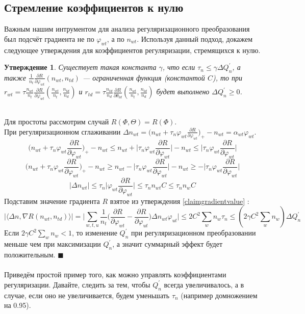 \documentclass[12pt]{article}
\newtheorem{claim}[remark]{Утверждение}
\newenvironment{Proof} 
	{\par\noindent{\bf Доказательство.}} 
	{\hfill$\blacksquare$}
\renewcommand{\leq}{\leqslant}
\renewcommand{\geq}{\geqslant}
\renewcommand{\phi}{\varphi}
\begin{document}
           \subsection{Стремление коэффициентов к нулю}
Важным нашим интрументом для анализа регуляризационного преобразования был подсчёт градиента не по $\phi_{wt}$, а по $n_{wt}$. Используя данный подход, докажем следующее утверждения для коэффициентов регуляризации, стремящихся к нулю.\\
\begin{claim}
Существует такая константа $\gamma$, что если $\tau_n \leq \gamma \Delta Q^{\prime}_n$, а также $\frac{1}{n_t} \frac{\partial{R}}{\partial{\phi_{wt}}}(n_{wt}, n_{td})$ --- ограниченная функция (константой $C$), то при $r_{wt} = \tau \frac{n_{wt}}{n_t} \frac{\partial{R}}{\partial{\phi_{wt}}} \left(\frac{n_{wt}}{n_t}, \frac{n_{td}}{n_d}\right)$ и $r_{td}= \tau \frac{n_{td}}{n_d} \frac{\partial{R}}{\partial{\theta_{td}}} \left(\frac{n_{wt}}{n_t}, \frac{n_{td}}{n_d}\right)$ будет выполнено $\Delta Q^{\prime}_n \geq 0$.
\end{claim}
\begin{Proof}
\ \\
Для простоты рассмотрим случай $R(\Phi, \Theta) = R(\Phi)$. \\
При регуляризационном сглаживании  $\Delta n_{wt} = \bigg( n_{wt} + \tau_n \phi_{wt} \frac{\partial{R}}{\partial{\phi_{wt}}}\bigg)_{+} - n_{wt} = \alpha_{wt} \phi_{wt}$.\\
\[
\bigg( n_{wt} + \tau_n \phi_{wt} \frac{\partial{R}}{\partial{\phi_{wt}}}\bigg)_{+} - n_{wt} \leq  n_{wt} +\bigg| \tau_n \phi_{wt} \frac{\partial{R}}{\partial{\phi_{wt}}}\bigg| - n_{wt} \leq \bigg| \tau_n \phi_{wt} \frac{\partial{R}}{\partial{\phi_{wt}}}\bigg|
\]
\[
\bigg( n_{wt} + \tau_n \phi_{wt} \frac{\partial{R}}{\partial{\phi_{wt}}}\bigg)_{+} - n_{wt} \geq  n_{wt} - \bigg| \tau_n \phi_{wt} \frac{\partial{R}}{\partial{\phi_{wt}}}\bigg| - n_{wt} \geq - \bigg| \tau_n \phi_{wt} \frac{\partial{R}}{\partial{\phi_{wt}}}\bigg|
\]
\[
|\Delta n_{wt} | \leq \tau_n\bigg|  \phi_{wt} \frac{\partial{R}}{\partial{\phi_{wt}}}\bigg| \leq \tau_n n_{wt} C \leq \tau_n n_{w} C
\]
Подставим значение градиента $R$ взятое из утверждения \ref{claimgradientvalue} :
\[
 \bigg|\langle\Delta n, \nabla R(n_{wt}, n_{td}) \rangle\bigg| = \bigg| \sum\limits_{w, t, u}  \frac{1}{n_{t}}  \bigg(  \frac{\partial{R}}{\partial{\phi_{wt}}}  -  \frac{\partial{R}}{\partial{\phi_{ut}}}  \bigg)  \Delta n_{wt}  \phi_{ut} \bigg| \leq 2C^2\sum_w n_w  \tau_n \leq (2 \gamma C^2\sum_w n_w) \Delta Q^{\prime}_n
\]
Если $ 2 \gamma C^2 \sum_w n_w < 1$, то изменение $Q^{\prime}_n$ при регуляризационном преобразовании меньше чем при максимизации $Q^{\prime}_n$, а значит суммарный эффект будет положительным.
\end{Proof}\ \\
\ \\
Приведём простой пример того, как можно управлять коэффициентами регуляризации. Давайте, следить за тем, чтобы $Q^{\prime}_n$ всегда увеличивалось, а в случае, если оно не увеличивается, будем уменьшать $\tau_n$ (например домножением на 0.95).
\end{document}
